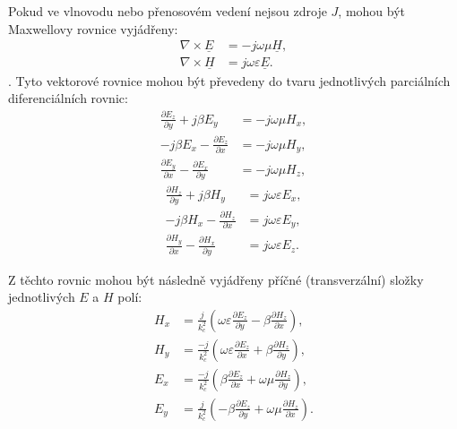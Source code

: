 \documentclass[12pt,a4paper,oneside]{article}
\numberwithin{equation}{section} %
\numberwithin{figure}{section} %
\numberwithin{table}{section} %
\newcommand{\faz}[1]{{\underline{#1}}} %
\begin{document}
Pokud ve vlnovodu nebo přenosovém vedení nejsou zdroje $J$, mohou být Maxwellovy rovnice vyjádřeny:
\begin{subequations}
\label{maxvektor2}
\begin{align}
\nabla \times \faz{E} &= -j\omega \mu \faz{H} ,
\\
\nabla \times \faz{H} &= j\omega \varepsilon \faz{E} .
\end{align}
\end{subequations}
.
Tyto vektorové rovnice mohou být převedeny do tvaru jednotlivých parciálních diferenciálních rovnic:
\begin{subequations}
\begin{align}
\frac{\partial E_z}{\partial y} + j \beta E_y &= -j \omega \mu H_x ,
\label{maxpart1}
\\
-j \beta E_x - \frac{\partial E_z}{\partial x} &= - j \omega \mu H_y ,
\\
\frac{\partial E_y}{\partial x} - \frac{\partial E_x}{\partial y} &= -j \omega \mu H_z ,
\end{align}
\end{subequations}
\begin{subequations}
\begin{align}
\frac{\partial H_z}{\partial y} + j \beta H_y &= j \omega \varepsilon E_x ,
\label{maxpart4}
\\
-j \beta H_x - \frac{\partial H_z}{\partial x} &= j \omega \varepsilon E_y ,
\label{maxpart5}
\\
\frac{\partial H_y}{\partial x} - \frac{\partial H_x}{\partial y} &= j \omega \varepsilon E_z .
\end{align}
\end{subequations}

Z těchto rovnic mohou být následně vyjádřeny příčné (transverzální) složky jednotlivých $E$ a $H$ polí:
\begin{subequations}
\label{vyjadreno}
\begin{align}
H_x &= \frac{j}{k^2_c} \left( \omega \varepsilon \frac{\partial E_z}{\partial y} - \beta \frac{\partial H_z}{\partial x} \right) ,
\\
H_y &= \frac{-j}{k^2_c} \left( \omega \varepsilon \frac{\partial E_z}{\partial x} + \beta \frac{\partial H_z}{\partial y} \right) ,
\\
E_x &= \frac{-j}{k^2_c} \left( \beta \frac{\partial E_z}{\partial x} + \omega \mu \frac{\partial H_z}{\partial y} \right) ,
\\
E_y &= \frac{j}{k^2_c} \left(- \beta \frac{\partial E_z}{\partial y} + \omega \mu \frac{\partial H_z}{\partial x} \right) .
\end{align}
\end{subequations}
\end{document}

